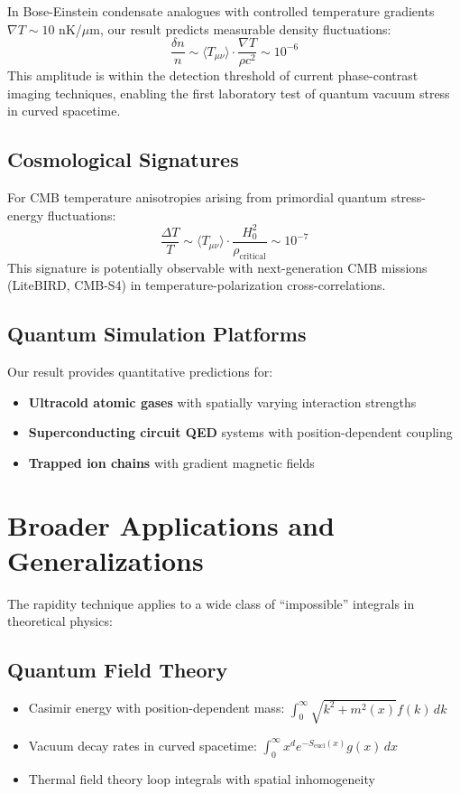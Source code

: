 \documentclass[12pt]{article}
\begin{document}
In Bose-Einstein condensate analogues with controlled temperature gradients $\nabla T \sim 10$ nK/$\mu$m, our result predicts measurable density fluctuations:
\begin{equation}
\frac{\delta n}{n} \sim \langle T_{\mu\nu}\rangle \cdot \frac{\nabla T}{\rho c^2} \sim 10^{-6}
\end{equation}
This amplitude is within the detection threshold of current phase-contrast imaging techniques, enabling the first laboratory test of quantum vacuum stress in curved spacetime.

\subsection{Cosmological Signatures}

For CMB temperature anisotropies arising from primordial quantum stress-energy fluctuations:
\begin{equation}
\frac{\Delta T}{T} \sim \langle T_{\mu\nu}\rangle \cdot \frac{H_0^2}{\rho_{\text{critical}}} \sim 10^{-7}
\end{equation}
This signature is potentially observable with next-generation CMB missions (LiteBIRD, CMB-S4) in temperature-polarization cross-correlations.

\subsection{Quantum Simulation Platforms}

Our result provides quantitative predictions for:
\begin{itemize}[leftmargin=*]
\item \textbf{Ultracold atomic gases} with spatially varying interaction strengths
\item \textbf{Superconducting circuit QED} systems with position-dependent coupling
\item \textbf{Trapped ion chains} with gradient magnetic fields
\end{itemize}

\section{Broader Applications and Generalizations}

The rapidity technique applies to a wide class of ``impossible'' integrals in theoretical physics:

\subsection{Quantum Field Theory}
\begin{itemize}[leftmargin=*]
\item Casimir energy with position-dependent mass: $\int_0^{\infty} \sqrt{k^2 + m^2(x)} f(k) \, dk$
\item Vacuum decay rates in curved spacetime: $\int_0^{\infty} x^d e^{-S_{\text{eucl}}(x)} g(x) \, dx$
\item Thermal field theory loop integrals with spatial inhomogeneity
\end{itemize}
\end{document}
